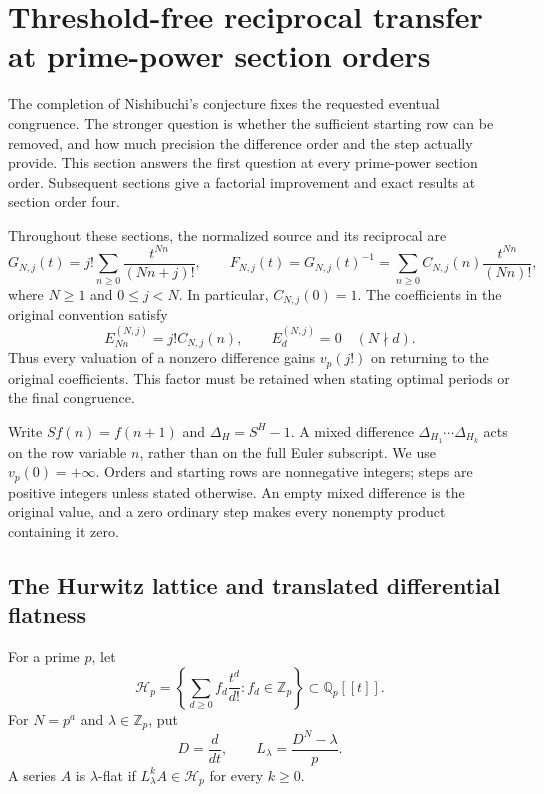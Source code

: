 \section{Threshold-free reciprocal transfer at prime-power section orders}
\label{sec:prime-power-transfer-final}

The completion of Nishibuchi's conjecture fixes the requested eventual
congruence. The stronger question is whether the sufficient starting row
can be removed, and how much precision the difference order and the step
actually provide. This section answers the first question at every
prime-power section order. Subsequent sections give a factorial improvement
and exact results at section order four.

Throughout these sections, the normalized source and its reciprocal are
\begin{equation}
 G_{N,j}(t)=j!\sum_{n\geq0}\frac{t^{Nn}}{(Nn+j)!},\qquad
 F_{N,j}(t)=G_{N,j}(t)^{-1}
   =\sum_{n\geq0}C_{N,j}(n)\frac{t^{Nn}}{(Nn)!},
 \label{eq:final-normalization}
\end{equation}
where $N\geq1$ and $0\leq j<N$. In particular, $C_{N,j}(0)=1$.
The coefficients in the original convention satisfy
\begin{equation}
 E_{Nn}^{(N,j)}=j!C_{N,j}(n),\qquad
 E_d^{(N,j)}=0\quad(N\nmid d).
 \label{eq:final-original-normalization}
\end{equation}
Thus every valuation of a nonzero difference gains $v_p(j!)$ on returning
to the original coefficients. This factor must be retained when stating
optimal periods or the final congruence.

Write $S f(n)=f(n+1)$ and $\Delta_H=S^H-1$. A mixed difference
$\Delta_{H_1}\cdots\Delta_{H_k}$ acts on the row variable $n$, rather than
on the full Euler subscript. We use $v_p(0)=+\infty$. Orders and starting
rows are nonnegative integers; steps are positive integers unless stated
otherwise. An empty mixed difference is the original value, and a zero
ordinary step makes every nonempty product containing it zero.

\subsection{The Hurwitz lattice and translated differential flatness}

\begin{definition}
For a prime $p$, let
\[
 \mathcal H_p=\left\{\sum_{d\geq0}f_d\frac{t^d}{d!}:
                    f_d\in\mathbb Z_p\right\}
       \subset\mathbb Q_p[[t]].
\]
For $N=p^a$ and $\lambda\in\mathbb Z_p$, put
\[
 D=\frac{d}{dt},\qquad L_\lambda=\frac{D^N-\lambda}{p}.
\]
A series $A$ is $\lambda$-flat if $L_\lambda^k A\in\mathcal H_p$ for every
$k\geq0$.
\end{definition}

